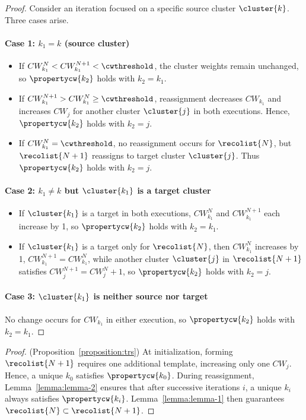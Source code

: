 \begin{proof}
Consider an iteration focused on a specific source cluster $\cluster{k}$. Three cases arise.

\paragraph{Case 1: $k_1 = k$ (source cluster)} 
\begin{itemize}
\item[(i)] If $CW_{k_1}^{N} < CW_{k_1}^{N+1} < \cwthreshold$, the cluster weights remain unchanged, so $\propertycw{k_2}$ holds with $k_2 = k_1$.
\item[(ii)] If $CW_{k_1}^{N+1} > CW_{k_1}^{N} \ge \cwthreshold$, reassignment decreases $CW_{k_1}$ and increases $CW_j$ for another cluster $\cluster{j}$ in both executions. Hence, $\propertycw{k_2}$ holds with $k_2 = j$.
\item[(iii)] If $CW_{k_1}^{N} = \cwthreshold$, no reassignment occurs for $\recolist{N}$, but $\recolist{N+1}$ reassigns to target cluster $\cluster{j}$. Thus $\propertycw{k_2}$ holds with $k_2 = j$.
\end{itemize}

\paragraph{Case 2: $k_1 \neq k$ but $\cluster{k_1}$ is a target cluster} 
\begin{itemize}
\item[(i)] If $\cluster{k_1}$ is a target in both executions, $CW_{k_1}^{N}$ and $CW_{k_1}^{N+1}$ each increase by 1, so $\propertycw{k_2}$ holds with $k_2 = k_1$.
\item[(ii)] If $\cluster{k_1}$ is a target only for $\recolist{N}$, then $CW_{k_1}^{N}$ increases by 1, $CW_{k_1}^{N+1} = CW_{k_1}^{N}$, while another cluster $\cluster{j}$ in $\recolist{N+1}$ satisfies $CW_j^{N+1} = CW_j^N + 1$, so $\propertycw{k_2}$ holds with $k_2 = j$.
\end{itemize}

\paragraph{Case 3: $\cluster{k_1}$ is neither source nor target} 
No change occurs for $CW_{k_1}$ in either execution, so $\propertycw{k_2}$ holds with $k_2 = k_1$.
\end{proof}

\begin{proof} (Proposition~\ref{proposition:trs})
At initialization, forming $\recolist{N+1}$ requires one additional template, increasing only one $CW_j$. Hence, a unique $k_0$ satisfies $\propertycw{k_0}$. During reassignment, Lemma~\ref{lemma:lemma-2} ensures that after successive iterations $i$, a unique $k_i$ always satisfies $\propertycw{k_i}$. Lemma~\ref{lemma:lemma-1} then guarantees $\recolist{N} \subset \recolist{N+1}$.
\end{proof}
